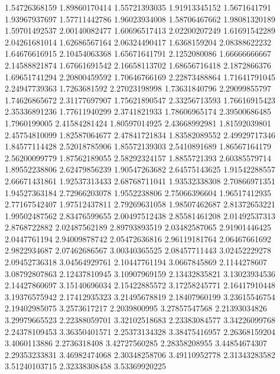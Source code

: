   1.54726368159    1.89860170414
  1.55721393035    1.91913345152
   1.5671641791    1.93967937697
  1.57711442786    1.96023934008
  1.58706467662    1.98081320189
  1.59701492537    2.00140082477
  1.60696517413    2.02200207249
  1.61691542289    2.04261681014
  1.62686567164    2.06324490417
   1.6368159204    2.08388622232
  1.64676616915    2.10454063368
  1.65671641791     2.1252080086
  1.66666666667    2.14588821874
  1.67661691542    2.16658113702
  1.68656716418     2.1872866376
  1.69651741294    2.20800459592
  1.70646766169    2.22873488864
  1.71641791045    2.24947739363
   1.7263681592    2.27023198998
  1.73631840796    2.29099855797
  1.74626865672    2.31177697907
  1.75621890547    2.33256713593
  1.76616915423    2.35336891236
  1.77611940299     2.3741821933
  1.78606965174    2.39500686485
   1.7960199005    2.41584281424
  1.80597014925    2.43668992981
  1.81592039801    2.45754810099
  1.82587064677    2.47841721834
  1.83582089552    2.49929717346
  1.84577114428    2.52018785906
  1.85572139303     2.5410891689
  1.86567164179    2.56200099779
  1.87562189055    2.58292324157
   1.8855721393    2.60385579714
  1.89552238806    2.62479856239
  1.90547263682    2.64575143625
  1.91542288557    2.66671431861
  1.92537313433    2.68768711041
  1.93532338308    2.70866971351
  1.94527363184    2.72966203078
   1.9552238806    2.75066396604
  1.96517412935    2.77167542407
  1.97512437811    2.79269631058
  1.98507462687    2.81372653221
  1.99502487562    2.83476599655
  2.00497512438    2.85581461208
  2.01492537313     2.8768722882
  2.02487562189    2.89793893519
  2.03482587065    2.91901446425
   2.0447761194    2.94009878742
  2.05472636816    2.96119181764
  2.06467661692     2.9822934687
  2.07462686567    3.00340365525
  2.08457711443    3.02452229278
  2.09452736318    3.04564929761
  2.10447761194     3.0667845869
   2.1144278607    3.08792807863
  2.12437810945    3.10907969159
  2.13432835821    3.13023934536
  2.14427860697    3.15140696034
  2.15422885572    3.17258245771
  2.16417910448    3.19376575942
  2.17412935323    3.21495678819
  2.18407960199    3.23615546754
  2.19402985075     3.2573617217
   2.2039800995    3.27857547568
  2.21393034826    3.29979665523
  2.22388059701    3.32102518683
  2.23383084577    3.34226099768
  2.24378109453    3.36350401571
  2.25373134328    3.38475416957
  2.26368159204     3.4060113886
   2.2736318408    3.42727560285
  2.28358208955    3.44854674307
  2.29353233831    3.46982474068
  2.30348258706    3.49110952778
  2.31343283582    3.51240103715
  2.32338308458    3.53369920225
